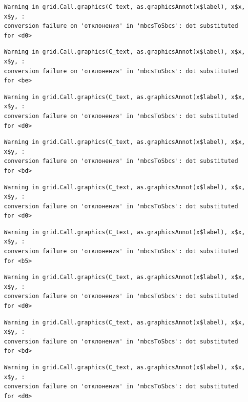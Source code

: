 \documentclass[
  letterpaper,
]{scrbook}
\theoremstyle{definition}
\theoremstyle{remark}
\begin{document}
\begin{verbatim}
Warning in grid.Call.graphics(C_text, as.graphicsAnnot(x$label), x$x, x$y, :
conversion failure on 'отклонения' in 'mbcsToSbcs': dot substituted for <d0>
\end{verbatim}

\begin{verbatim}
Warning in grid.Call.graphics(C_text, as.graphicsAnnot(x$label), x$x, x$y, :
conversion failure on 'отклонения' in 'mbcsToSbcs': dot substituted for <be>
\end{verbatim}

\begin{verbatim}
Warning in grid.Call.graphics(C_text, as.graphicsAnnot(x$label), x$x, x$y, :
conversion failure on 'отклонения' in 'mbcsToSbcs': dot substituted for <d0>
\end{verbatim}

\begin{verbatim}
Warning in grid.Call.graphics(C_text, as.graphicsAnnot(x$label), x$x, x$y, :
conversion failure on 'отклонения' in 'mbcsToSbcs': dot substituted for <bd>
\end{verbatim}

\begin{verbatim}
Warning in grid.Call.graphics(C_text, as.graphicsAnnot(x$label), x$x, x$y, :
conversion failure on 'отклонения' in 'mbcsToSbcs': dot substituted for <d0>
\end{verbatim}

\begin{verbatim}
Warning in grid.Call.graphics(C_text, as.graphicsAnnot(x$label), x$x, x$y, :
conversion failure on 'отклонения' in 'mbcsToSbcs': dot substituted for <b5>
\end{verbatim}

\begin{verbatim}
Warning in grid.Call.graphics(C_text, as.graphicsAnnot(x$label), x$x, x$y, :
conversion failure on 'отклонения' in 'mbcsToSbcs': dot substituted for <d0>
\end{verbatim}

\begin{verbatim}
Warning in grid.Call.graphics(C_text, as.graphicsAnnot(x$label), x$x, x$y, :
conversion failure on 'отклонения' in 'mbcsToSbcs': dot substituted for <bd>
\end{verbatim}

\begin{verbatim}
Warning in grid.Call.graphics(C_text, as.graphicsAnnot(x$label), x$x, x$y, :
conversion failure on 'отклонения' in 'mbcsToSbcs': dot substituted for <d0>
\end{verbatim}
\end{document}
